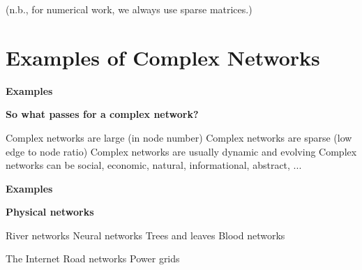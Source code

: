       (n.b., for numerical work, we 
      always use sparse matrices.)
    
  




\section{Examples of Complex Networks}

  \textbf{Examples}

  \textbf{So what passes for a complex network?}
    
     Complex networks are \alert{large} (in node number)
     Complex networks are \alert{sparse} (low edge to node ratio)
     Complex networks are usually \alert{dynamic} and \alert{evolving}
     Complex networks can be social, economic, natural, informational, abstract, ...
    
  



  \textbf{Examples}

  \textbf{Physical networks}
        
         River networks
         Neural networks
         Trees and leaves
         Blood networks
        

      
        
         The Internet
         Road networks
         Power grids
        

      

  \medskip

